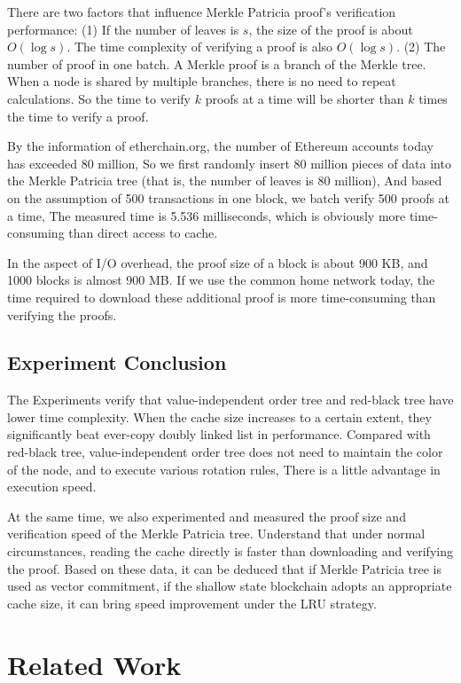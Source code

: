 \documentclass[conference]{IEEEtran}
\begin{document}
There are two factors that influence
Merkle Patricia proof's verification performance:
(1) If the number of leaves is $s$,
the size of the proof is about $O(\log s)$.
The time complexity of verifying a proof is also $O(\log s)$.
(2) The number of proof in one batch.
A Merkle proof is a branch of the Merkle tree.
When a node is shared by multiple branches,
there is no need to repeat calculations.
So the time to verify $k$ proofs at a time will be
shorter than $k$ times the time to verify a proof.

By the information of etherchain.org,
the number of Ethereum accounts today has exceeded 80 million,
So we first randomly insert 80 million pieces
of data into the Merkle Patricia
tree (that is, the number of leaves is 80 million),
And based on the assumption of 500 transactions in
one block, we batch verify 500 proofs at a time,
The measured time is 5.536 milliseconds, which is
obviously more time-consuming than direct access to cache.

In the aspect of I/O overhead, the proof size of a
block is about 900 KB, and 1000 blocks is almost 900 MB.
If we use the common home network today,
the time required to download these additional
proof is more time-consuming than verifying the proofs.

\subsection{Experiment Conclusion}

The Experiments verify that value-independent order tree and red-black tree
have lower time complexity. When the cache size increases
to a certain extent, they significantly beat ever-copy
doubly linked list in performance. Compared with
red-black tree, value-independent order tree does not need to maintain
the color of the node, and to execute various rotation rules,
There is a little advantage in execution speed.

At the same time, we also experimented and measured
the proof size and verification speed of the Merkle
Patricia tree. Understand that under normal circumstances,
reading the cache directly is faster than downloading
and verifying the proof. Based on these data,
it can be deduced that if Merkle Patricia tree
is used as vector commitment, if the shallow state
blockchain adopts an appropriate cache size, it
can bring speed improvement under the LRU strategy.

\section{Related Work}
\end{document}
